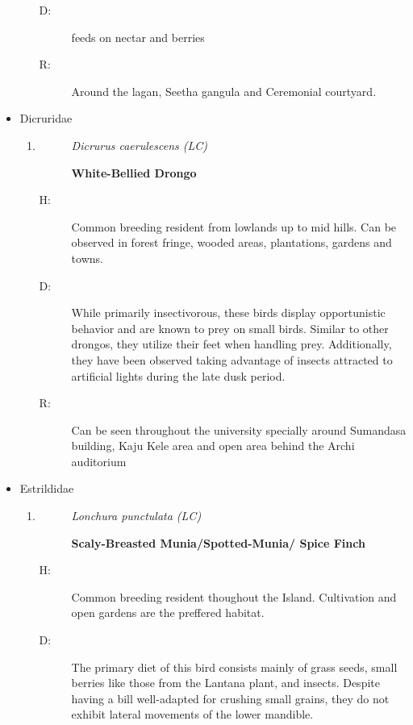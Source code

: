 \begin{itemize}
\begin{enumerate}
\begin{description}
\item[D: ]%
 feeds on nectar and berries%
\item[R: ]%
Around the lagan, Seetha gangula and Ceremonial courtyard.%
\end{description}%
\end{enumerate}%
\item%
Dicruridae%
\begin{enumerate}%
\item%
\begin{description}%
\item[]%
\textit{Dicrurus caerulescens (LC)}%
\item[]%
\textbf{White{-}Bellied Drongo}%
\end{description}%
\begin{description}%
\item[H: ]%
Common breeding resident from lowlands up to mid hills. Can be observed in forest fringe, wooded areas, plantations, gardens and towns.%
\item[D: ]%
While primarily insectivorous, these birds display opportunistic behavior and are known to prey on small birds. Similar to other drongos, they utilize their feet when handling prey. Additionally, they have been observed taking advantage of insects attracted to artificial lights during the late dusk period.%
\item[R: ]%
Can be seen throughout the university specially around Sumandasa building, Kaju Kele area and open area behind the Archi auditorium%
\end{description}%
\end{enumerate}%
\item%
Estrildidae%
\begin{enumerate}%
\item%
\begin{description}%
\item[]%
\textit{Lonchura punctulata (LC)}%
\item[]%
\textbf{Scaly{-}Breasted Munia/Spotted{-}Munia/ Spice Finch}%
\end{description}%
\begin{description}%
\item[H: ]%
Common breeding resident thoughout the Island. Cultivation and open gardens are the preffered habitat.%
\item[D: ]%
The primary diet of this bird consists mainly of grass seeds, small berries like those from the Lantana plant, and insects. Despite having a bill well{-}adapted for crushing small grains, they do not exhibit lateral movements of the lower mandible.%

\end{description}
\end{enumerate}
\end{itemize}
